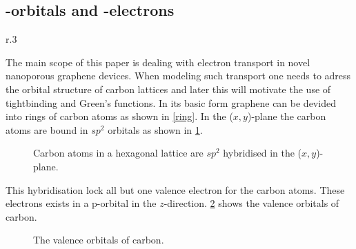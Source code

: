 \subsection{\mathinhead{\pi}{\pi}-orbitals and \mathinhead{\pi}{\pi}-electrons}
\begin{wrapfigure}[7]{r}{.3\textwidth}
	\vspace{-2.3em}
	\centering
	\caption{Graphene lattices consists of hexagonal arrangements of carbon atoms.}\label{ring}
\end{wrapfigure}
The main scope of this paper is dealing with electron transport in novel nanoporous graphene devices.
When modeling such transport one needs to adress the orbital structure of carbon lattices and later this will motivate the use of tightbinding and Green's functions.
In its basic form graphene can be devided into rings of carbon atoms as shown in \cref{ring}. In the (\(x,y\))-plane the carbon atoms are bound in \(sp^2\) orbitals as shown in \cref{sp2}.
\begin{figure}[H]
	\centering
	\caption{Carbon atoms in a hexagonal lattice are \(sp^2\) hybridised in the (\(x,y\))-plane.}\label{sp2}
\end{figure}
This hybridisation lock all but one valence electron for the carbon atoms. These electrons exists in a p-orbital in the \(z\)-direction.
\cref{p} shows the valence orbitals of carbon.
\begin{figure}[H]
	\begin{center}
		\caption{The valence orbitals of carbon.}
		\label{p}
	\end{center}
\end{figure}
